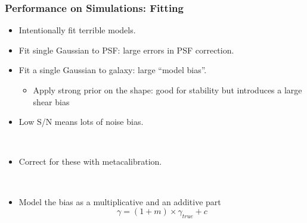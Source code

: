 \documentclass{beamer}
\newcommand{\mcal}{metacalibration}
\begin{document}
\frame
{
    \frametitle{Performance on Simulations: Fitting}

 
    \begin{itemize}
        \item Intentionally fit {\color{brightred} terrible models}.

        \item Fit single Gaussian to PSF: large errors in
            PSF correction.

        \item Fit a single Gaussian to galaxy: large ``model bias''.

        \begin{itemize}
            \item Apply strong prior on the shape: good for stability but
                introduces a large shear bias
        \end{itemize}
        \item Low S/N means lots of noise bias.

        ~
        \item Correct for these with \mcal.

        ~
        \item Model the bias as a multiplicative and an additive part
            {\color{lightskyblue} 
                \begin{equation}
                    \gamma = (1 + m ) \times \gamma_{true} + c \nonumber
                \end{equation}
            }

    \end{itemize}
}
\end{document}
